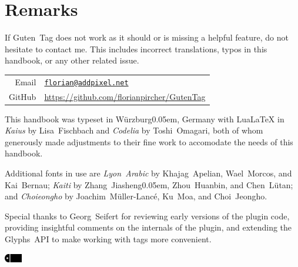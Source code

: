 \chapter{Remarks}%
\label{cha:remarks}

If Guten~Tag does not work as it should or is missing a helpful feature, do not hesitate to contact me. This includes incorrect translations, typos in this handbook, or any other related issue.

\setlength{\tabcolsep}{0pt}
\medbreak\begin{tabular}{rl}
  Email  & \capskip\href{mailto:florian@addpixel.net}{\texttt{florian@addpixel.net}}\\
  GitHub & \capskip\url{https://github.com/florianpircher/GutenTag} \\
\end{tabular}

\bigbreak\noindent This handbook was typeset in Würzburg\kern0.05em, Germany
with {Lua\LaTeX} in \emph{Kaius} by Lisa~Fischbach and \emph{Codelia} by Toshi~Omagari,
both of whom generously made adjustments to their fine work to accomodate the needs of this handbook.

\bigbreak\noindent Additional fonts in use are \emph{Lyon~Arabic} by Khajag~Apelian, Wael~Morcos, and Kai~Bernau;
\emph{Kaiti} by Zhang~Jiasheng\kern0.05em, Zhou~Huanbin, and Chen~Lütan;
and \emph{Choieongho} by Joachim~Müller-Lancé, Ku~Moa, and Choi~Jeongho.

\bigbreak\noindent Special thanks to Georg~Seifert for reviewing early versions of the plugin code,
providing insightful comments on the internals of the plugin, and
extending the Glyphs~API to make working with tags more convenient.

\bigbreak

\begin{center}
  \includegraphics[height=1em]{Images/Tag.pdf} \\
  {}
\end{center}
